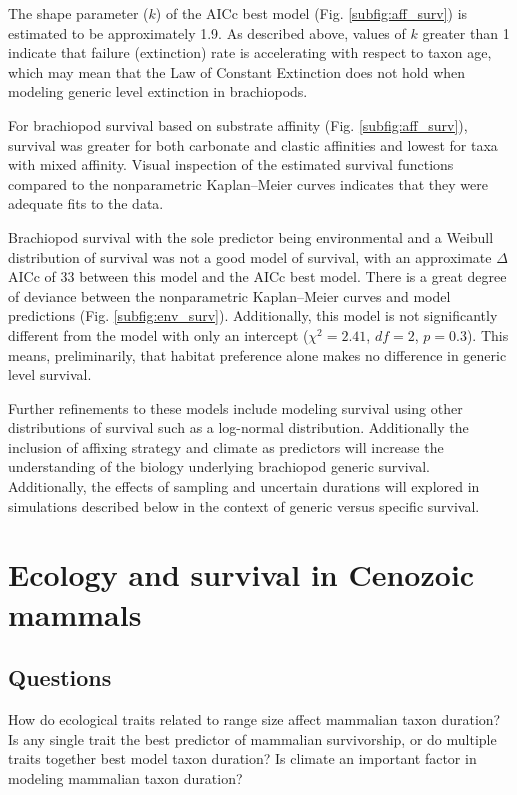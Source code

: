 \documentclass[12pt,letterpaper]{article}
\begin{document}
The shape parameter (\(k\)) of the AICc best model (Fig. \ref{subfig:aff_surv}) is estimated to be approximately 1.9. As described above, values of \(k\) greater than 1 indicate that failure (extinction) rate is accelerating with respect to taxon age, which may mean that the Law of Constant Extinction does not hold when modeling generic level extinction in brachiopods.

For brachiopod survival based on substrate affinity (Fig. \ref{subfig:aff_surv}), survival was greater for both carbonate and clastic affinities and lowest for taxa with mixed affinity. Visual inspection of the estimated survival functions compared to the nonparametric Kaplan--Meier curves indicates that they were adequate fits to the data. 

Brachiopod survival with the sole predictor being environmental and a Weibull distribution of survival was not a good model of survival, with an approximate \(\Delta\)AICc of 33 between this model and the AICc best model. There is a great degree of deviance between the nonparametric Kaplan--Meier curves and model predictions (Fig. \ref{subfig:env_surv}). Additionally, this model is not significantly different from the model with only an intercept (\(\chi^{2} = 2.41\), \(df = 2\), \(p = 0.3\)). This means, preliminarily, that habitat preference alone makes no difference in generic level survival.

Further refinements to these models include modeling survival using other distributions of survival such as a log-normal distribution. Additionally the inclusion of affixing strategy and climate as predictors will increase the understanding of the biology underlying brachiopod generic survival. Additionally, the effects of sampling and uncertain durations will explored in simulations described below in the context of generic versus specific survival.


\section{Ecology and survival in Cenozoic mammals}

\subsection{Questions} 
How do ecological traits related to range size affect mammalian taxon duration? Is any single trait the best predictor of mammalian survivorship, or do multiple traits together best model taxon duration? Is climate an important factor in modeling mammalian taxon duration?
\end{document}
